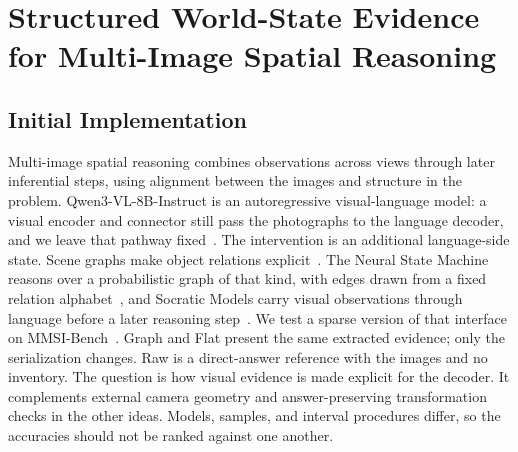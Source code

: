 %
%
\providecommand{\WorldStateDir}{.}
\providecommand{\texorpdfstring}[2]{#1}

\section{\texorpdfstring{Structured World-State Evidence\\ for Multi-Image Spatial Reasoning}{Structured World-State Evidence for Multi-Image Spatial Reasoning}}
\label{sec:worldstate}

\subsection{Initial Implementation}

Multi-image spatial reasoning combines observations across views through later inferential steps, using alignment between the images and structure in the problem. Qwen3-VL-8B-Instruct is an autoregressive visual-language model: a visual encoder and connector still pass the photographs to the language decoder, and we leave that pathway fixed~\citep{bai2025qwen3vl}. The intervention is an additional language-side state. Scene graphs make object relations explicit~\citep{xu2017scenegraph}. The Neural State Machine reasons over a probabilistic graph of that kind, with edges drawn from a fixed relation alphabet~\citep{hudson2019nsm}, and Socratic Models carry visual observations through language before a later reasoning step~\citep{zeng2022socratic}. We test a sparse version of that interface on MMSI-Bench~\citep{yang2025mmsi}. Graph and Flat present the same extracted evidence; only the serialization changes. Raw is a direct-answer reference with the images and no inventory. The question is how visual evidence is made explicit for the decoder. It complements external camera geometry and answer-preserving transformation checks in the other ideas. Models, samples, and interval procedures differ, so the accuracies should not be ranked against one another.

